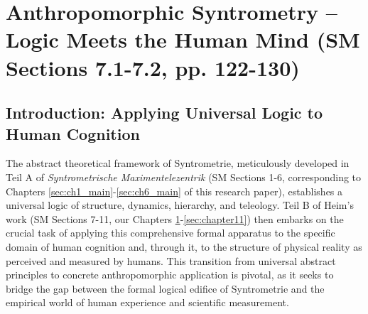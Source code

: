 \documentclass[
    12pt,              %
    a4paper,           %
    headings=normal,   %
    twoside=true,      %
    BCOR=8mm,          %
]{scrbook}
\begin{document}
\clearpage

\chapter{Anthropomorphic Syntrometry – Logic Meets the Human Mind (SM Sections 7.1-7.2, pp. 122-130)}
\label{sec:ch7_main} 

\section{Introduction: Applying Universal Logic to Human Cognition}
\label{sec:ch7_0_intro}

The abstract theoretical framework of Syntrometrie, meticulously developed in Teil A of \textit{Syntrometrische Maximentelezentrik} (SM Sections 1-6, corresponding to Chapters \ref{sec:ch1_main}-\ref{sec:ch6_main} of this research paper), establishes a universal logic of structure, dynamics, hierarchy, and teleology. Teil B of Heim's work (SM Sections 7-11, our Chapters \ref{sec:ch7_main}-\ref{sec:chapter11}) then embarks on the crucial task of applying this comprehensive formal apparatus to the specific domain of human cognition and, through it, to the structure of physical reality as perceived and measured by humans. This transition from universal abstract principles to concrete anthropomorphic application is pivotal, as it seeks to bridge the gap between the formal logical edifice of Syntrometrie and the empirical world of human experience and scientific measurement.
\end{document}
